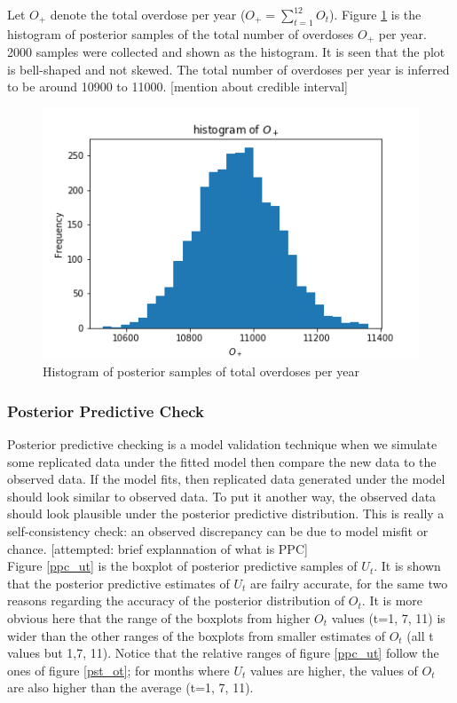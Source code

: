 \documentclass[12pt]{article}
\begin{document}
{Let $O_+$ denote the total overdose per year ($O_+ = \sum_{t=1}^{12}O_t $). Figure \ref{hst_ot} is the histogram of posterior samples of the total number of overdoses $O_+$ per year. 2000 samples were collected and shown as the histogram.  It is seen that the plot is bell-shaped and not skewed. The total number of overdoses per year is inferred to be around 10900 to 11000. [mention about credible interval] \\

\begin{figure}[h]
	\centering
	\includegraphics[width=1\linewidth]{Figures/hist_sum_ot.png}
	\caption{Histogram of posterior samples of total overdoses per year}
	\label{hst_ot}
\end{figure}

\newpage
\subsubsection{Posterior Predictive Check}
Posterior predictive checking is a model validation technique when we simulate some replicated data under the fitted model then compare the new data to the observed data. If the model fits, then replicated data generated under the model should look similar to observed data. To put it another way, the observed data should look plausible under the posterior predictive distribution. This is really a self-consistency check: an observed discrepancy can be due to model misfit or chance. \cite{bda_galman}
[attempted: brief explannation of what is PPC]\\

Figure \ref{ppc_ut} is the boxplot of posterior predictive samples of $U_t$. It is shown that the posterior predictive estimates of $U_t$ are failry accurate, for the same two reasons regarding the accuracy of the posterior distribution of $O_t$. It is more obvious here that the range of the boxplots from higher $O_t$ values (t=1, 7, 11) is wider than the other ranges of the boxplots from smaller estimates of $O_t$ (all t values but 1,7, 11). Notice that the relative ranges of figure \ref{ppc_ut} follow the ones of figure \ref{pst_ot}; for months where $U_t$ values are higher, the values of $O_t$ are also higher than the average (t=1, 7, 11).\\

}
\end{document}
